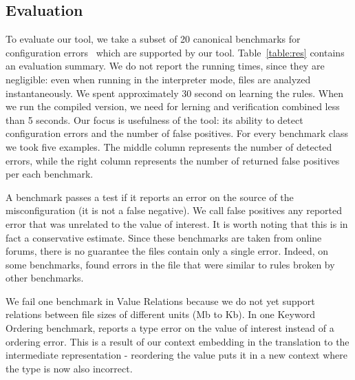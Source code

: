 \subsection{Evaluation}

To evaluate our tool, we take a subset of 20 canonical benchmarks for configuration errors~\cite{yin11anempirical, configdataset} which are supported by our tool. Table~\ref{table:res} contains an evaluation summary.
We do not report the running times, since they are negligible: even when
 running in the interpreter mode, files are analyzed instantaneously. We spent approximately 30 second on learning the rules. When we run the compiled version, we need for lerning and verification 
combined less than 5 seconds. Our focus is usefulness of the tool: its 
 ability to detect configuration errors and the number of false positives.
 For every benchmark class we took five examples. The middle column represents the number of detected errors, while the right column represents the number of returned false positives per each benchmark.
 


\iffalse{
We take the subset of benchmarks for which our tool has implemented rule modules.
Although our tool is general and extensible, we have only implemented four types of rules over the MySQL configuration language.
It would not make sense to run \app on misconfigurations for which there are no rule modules.}
\fi

A benchmark passes a test if it reports an error on the source of the misconfiguration (it is not a false negative).
We call false positives any reported error that was unrelated to the value of interest.
It is worth noting that this is in fact a conservative estimate.
Since these benchmarks are taken from online forums, there is no guarantee the files contain only a single error.
Indeed, on some benchmarks, \app found errors in the file that were similar to rules broken by other benchmarks. 

We fail one benchmark in Value Relations because we do not yet support relations between file sizes of different units (Mb to Kb).
In one Keyword Ordering benchmark, \app reports a type error on the value of interest instead of a ordering error.
This is a result of our context embedding in the translation to the intermediate representation - reordering the value puts it in a new context where the type is now also incorrect.

